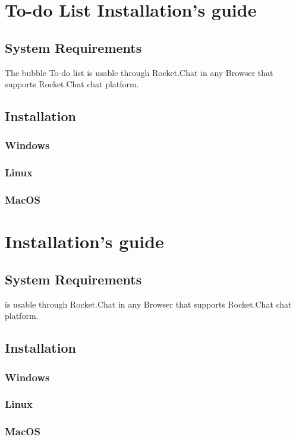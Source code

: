 \section{To-do List Installation's guide}

\subsection{System Requirements}
The bubble To-do list is usable through Rocket.Chat in any Browser that supports Rocket.Chat chat platform.

\subsection{Installation}

\subsubsection{Windows}

\subsubsection{Linux}

\subsubsection{MacOS}

\section{\DemoName{} Installation's guide}

\subsection{ \DemoName{} System Requirements}
\DemoName{} is usable through Rocket.Chat in any Browser that supports Rocket.Chat chat platform.

\subsection{Installation}

\subsubsection{Windows}

\subsubsection{Linux}

\subsubsection{MacOS}
